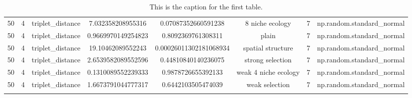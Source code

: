 \begin{longtable}{||c c c c c c c c||}
        50 & 4 & triplet\_distance & 7.032358208955316 & 0.07087352660591238 & 8 niche ecology & 7 & np.random.standard\_normal \\ 
        50 & 4 & triplet\_distance & 0.9669970149254823 & 0.8092369761308311 & plain & 7 & np.random.standard\_normal \\ 
        50 & 4 & triplet\_distance & 19.10462089552243 & 0.00026011302181068934 & spatial structure & 7 & np.random.standard\_normal \\ 
        50 & 4 & triplet\_distance & 2.6539582089552596 & 0.44810840140236075 & strong selection & 7 & np.random.standard\_normal \\ 
        50 & 4 & triplet\_distance & 0.1310089552239333 & 0.9878726655392133 & weak 4 niche ecology & 7 & np.random.standard\_normal \\ 
        50 & 4 & triplet\_distance & 1.6673791044777317 & 0.6442103505474039 & weak selection & 7 & np.random.standard\_normal \\ [1ex]
     \hline
    \caption{This is the caption for the first table.}
    \label{reconstruction-error-comparisons-between-regimes-stats:1}
  \end{longtable}